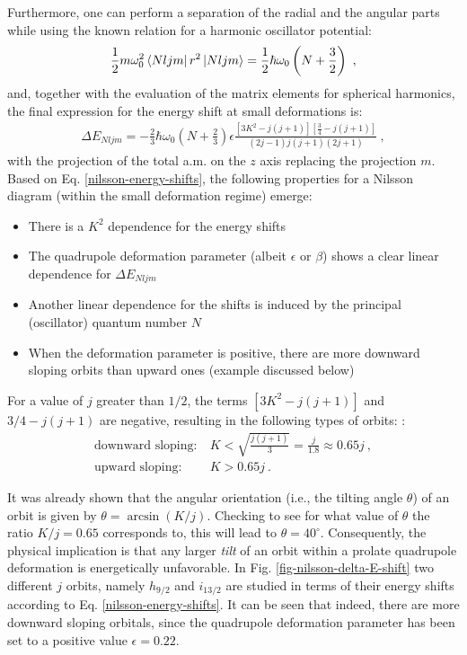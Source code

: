 Furthermore, one can perform a separation of the radial and the angular parts while using the known relation for a harmonic oscillator potential:
\begin{align}
    \frac{1}{2}m\omega_0^2\bra{Nljm}r^2\ket{Nljm}=\frac{1}{2}\hbar\omega_0\left(N+\frac{3}{2}\right)\ ,
\end{align}
and, together with the evaluation of the matrix elements for spherical harmonics, the final expression for the energy shift at small deformations is:
\begin{align}
    \Delta E_{Nljm}=-\frac{2}{3}\hbar\omega_0\left(N+\frac{2}{3}\right)\epsilon\frac{\left[3K^2-j(j+1)\right]\left[\frac{3}{4}-j(j+1)\right]}{(2j-1)j(j+1)(2j+1)}\ ,
    \label{nilsson-energy-shifts}
\end{align}
with the projection of the total a.m. on the $z$ axis replacing the projection $m$. Based on Eq. \ref{nilsson-energy-shifts}, the following properties for a Nilsson diagram (within the small deformation regime) emerge:
\begin{itemize}
    \item There is a $K^2$ dependence for the energy shifts
    \item The quadrupole deformation parameter (albeit $\epsilon$ or $\beta$) shows a clear linear dependence for $\Delta E_{Nljm}$
    \item Another linear dependence for the shifts is induced by the principal (oscillator) quantum number $N$
    \item When the deformation parameter is positive, there are more downward sloping orbits than upward ones (example discussed below)
\end{itemize}

For a value of $j$ greater than $1/2$, the terms $\left[3K^2-j(j+1)\right]$ and $3/4-j(j+1)$ are negative, resulting in the following types of orbits: \cite{krane1991introductory}:
\begin{align}
    \text{downward sloping:}&\ K<\sqrt{\frac{j(j+1)}{3}}=\frac{j}{1.8}\approx 0.65j\ ,\\
    \text{upward sloping:}&\ K>0.65j\ .
\end{align}

It was already shown that the angular orientation (i.e., the tilting angle $\theta$) of an orbit is given by $\theta=\arcsin(K/j)$. Checking to see for what value of $\theta$ the ratio $K/j=0.65$ corresponds to, this will lead to $\theta=40^\circ$. Consequently, the physical implication is that any larger \emph{tilt} of an orbit within a prolate quadrupole deformation is energetically unfavorable. In Fig. \ref{fig-nilsson-delta-E-shift} two different $j$ orbits, namely $h_{9/2}$ and $i_{13/2}$ are studied in terms of their energy shifts according to Eq. \ref{nilsson-energy-shifts}. It can be seen that indeed, there are more downward sloping orbitals, since the quadrupole deformation parameter has been set to a positive value $\epsilon=0.22$.

